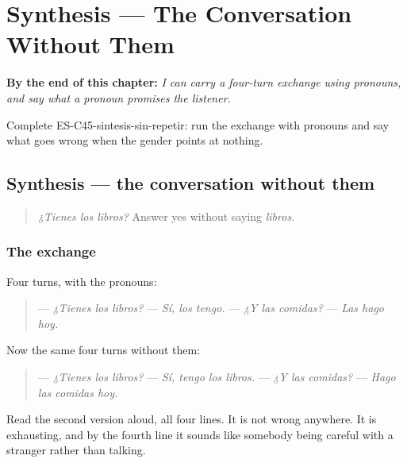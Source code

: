 
\chapter{Synthesis --- The Conversation Without Them}
\label{ch:synthesis-without-repeating}

\begin{chapteropening}
\textbf{By the end of this chapter:} \emph{I can carry a four-turn exchange using pronouns, and say what a pronoun promises the listener.}

Complete ES-C45-sintesis-sin-repetir: run the exchange with pronouns and say what goes wrong when the gender points at nothing.
\end{chapteropening}

\section[Practice]{Synthesis — the conversation without them}

\label{lesson:ES-C45-sintesis-sin-repetir}



\begin{quote}
\emph{¿Tienes los libros?} Answer yes without saying \emph{libros}.
\end{quote}

\subsection*{The exchange}
Four turns, with the pronouns:

\begin{quote}
— \emph{¿Tienes los libros?} — \emph{Sí, los tengo.} — \emph{¿Y las comidas?} — \emph{Las hago hoy.}
\end{quote}

Now the same four turns without them:

\begin{quote}
— \emph{¿Tienes los libros?} — \emph{Sí, tengo los libros.} — \emph{¿Y las comidas?} — \emph{Hago las comidas hoy.}
\end{quote}

Read the second version aloud, all four lines. It is not wrong anywhere. It is exhausting, and by the fourth line it sounds like somebody being careful with a stranger rather than talking.

